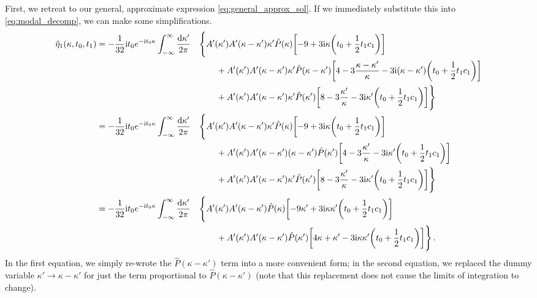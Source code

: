 \documentclass{jfm}
\newcommand{\im}{\mathrm{i}}
\begin{document}
First, we retreat to our general, approximate expression
\cref{eq:general_approx_sol}.
If we immediately substitute this into \cref{eq:modal_decomp}, we can
make some simplifications.
\begin{alignat*}{2}
  \hat{\eta}_1(\kappa,t_0,t_1) &=
  -\frac{1}{32} \im t_0 e^{-\im t_0 \kappa}
  \int_{-\infty}^{\infty} \frac{\dd{\kappa'}}{2\pi}
  && \Biggl\{
    A'(\kappa') A'(\kappa-\kappa') \kappa' \hat{P}(\kappa)
    \bqty{-9 + 3 \im \kappa \pqty{t_0 + \frac{1}{2} t_1 c_1}} \\
  &&&\qquad
    +A'(\kappa') A'(\kappa-\kappa') \kappa' \hat{P}(\kappa-\kappa')
    \bqty{4 - 3 \frac{\kappa - \kappa'}{\kappa} - 3
    \im (\kappa-\kappa') \pqty{t_0 + \frac{1}{2} t_1 c_1} } \\
  &&&\qquad
    +A'(\kappa') A'(\kappa-\kappa') \kappa' \hat{P}(\kappa')
    \bqty{8 - 3 \frac{\kappa'}{\kappa} - 3 \im \kappa'
    \pqty{t_0 + \frac{1}{2} t_1 c_1}}
  \Biggr\}
  \\
  &=
  -\frac{1}{32} \im t_0 e^{-\im t_0 \kappa}
  \int_{-\infty}^{\infty} \frac{\dd{\kappa'}}{2\pi}
  && \Biggl\{
    A'(\kappa') A'(\kappa-\kappa') \kappa' \hat{P}(\kappa)
    \bqty{-9 + 3 \im \kappa \pqty{t_0 + \frac{1}{2} t_1 c_1}} \\
  &&&\qquad
    +A'(\kappa') A'(\kappa-\kappa') (\kappa - \kappa') \hat{P}(\kappa')
    \bqty{4 - 3 \frac{\kappa'}{\kappa} - 3
    \im \kappa' \pqty{t_0 + \frac{1}{2} t_1 c_1} } \\
  &&&\qquad
    +A'(\kappa') A'(\kappa-\kappa') \kappa' \hat{P}(\kappa')
    \bqty{8 - 3 \frac{\kappa'}{\kappa} - 3 \im \kappa'
    \pqty{t_0 + \frac{1}{2} t_1 c_1}}
  \Biggr\}
  \\
  &=
  -\frac{1}{32} \im t_0 e^{-\im t_0 \kappa}
  \int_{-\infty}^{\infty} \frac{\dd{\kappa'}}{2\pi}
  && \Biggl\{
    A'(\kappa') A'(\kappa-\kappa') \hat{P}(\kappa)
    \bqty{-9 \kappa' + 3 \im \kappa \kappa' \pqty{t_0 + \frac{1}{2} t_1 c_1}} \\
  &&&\qquad
    +A'(\kappa') A'(\kappa-\kappa') \hat{P}(\kappa')
    \bqty{4 \kappa + \kappa' -3 \im \kappa \kappa'
    \pqty{t_0 + \frac{1}{2} t_1 c_1}}
  \Biggr\}
  \,.
\end{alignat*}
In the first equation, we simply re-wrote the $\hat{P}(\kappa-\kappa')$ term
into a more convenient form; in the second equation, we replaced the
dummy variable $\kappa' \to \kappa-\kappa'$ for just the term
proportional to $\hat{P}(\kappa-\kappa')$ (note that this replacement
does not cause the limits of integration to change).
\end{document}
